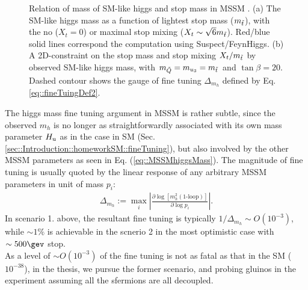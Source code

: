 \begin{figure}[h]
  \centering
    \caption{Relation of mass of SM-like higgs and stop mass in MSSM \cite{Higgs125SUSYHall}. (a) The SM-like higgs mass as a function of lightest stop mass ($m_{\tilde{t}}$), with the no ($X_t=0$) or maximal stop mixing ($X_t \sim \sqrt{6}m_{\tilde{t}}$). Red/blue solid lines correspond the computation using Suspect/FeynHiggs.  (b) A 2D-constraint on the stop mass and stop mixing $X_t/m_{\tilde{t}}$ by observed SM-like higgs mass, with $m_{\tilde{Q}} = m_{u_3} = m_{\tilde{t}}$ and $\tan{\beta}=20$. Dashed contour shows the gauge of fine tuning $\Delta_{m_{h}}$ defined by Eq. \ref{eq::fineTuingDef2}. }
    \label{fig::Introduction::higgsMass_mixing}
\end{figure}

The higgs mass fine tuning argument in MSSM is rather subtle, since the observed $m_{h}$ is no longer as straightforwardly associated with its own mass parameter $H_{\mathrm{u}}$ as in the case in SM (Sec. \ref{sec::Introduction::homeworkSM::fineTuning}), but also involved by the other MSSM parameters as seen in Eq. (\ref{eq::MSSMhiggsMass}).
The magnitude of fine tuning is usually quoted by the linear response of any arbitrary MSSM parameters in unit of mass $p_i$:
\begin{align}
\Delta_{m_{h}} := \max_i \left|  \frac{\partial \log [m^2_h (\mbox{1-loop})] }{\partial \log{p_i}} \right|.
\label{eq::fineTuingDef2}
\end{align}
In scenario 1. above, the resultant fine tuning is typically $1/\Delta_{m_{h}} \sim O(10^{-3})$, while $\sim 1\%$ is achievable in the scnerio 2 in the most optimistic case with $\sim 500\gev$ stop.  \\
%
As a level of $\sim O(10^{-3})$ of the fine tuning is not as fatal as that in the SM ($10^{-38}$),
in the thesis, we pursue the former scenario, and probing gluinos in the experiment assuming all the sfermions are all decoupled. \\
%


